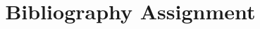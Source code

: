 \documentclass[12pt]{article}
\begin{document}
\title{Bibliography Assignment}
\maketitle
\cite{lahane2019review}


\end{document}
